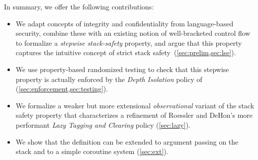 \documentclass[acmsmall,review,anonymous]{acmart}\settopmatter{printfolios=true,printccs=false,printacmref=false}
\begin{document}

In summary, we offer the following contributions:

\begin{itemize}
\item We adapt concepts of integrity and confidentiality from language-based
security, combine these with an existing notion of well-bracketed
control flow to formalize a {\em stepwise stack-safety}
property, and argue that this property captures the intuitive concept of
strict stack
safety~(\cref{sec:prelim,sec:lse}).
\item We use property-based randomized testing to check that this stepwise
property is actually enforced by the {\em Depth Isolation} policy
of~\citet{DBLP:conf/sp/RoesslerD18} (\cref{sec:enforcement,sec:testing}).
\item We formalize a
weaker but more extensional \emph{observational} variant of the stack safety
property that characterizes a refinement of Roessler and DeHon's more
performant {\em Lazy Tagging and  Clearing} policy (\cref{sec:lazy}).
\item We show that the definition can be
extended to argument passing on the stack and to a simple coroutine system (\cref{sec:ext}).
\end{itemize}
\end{document}

